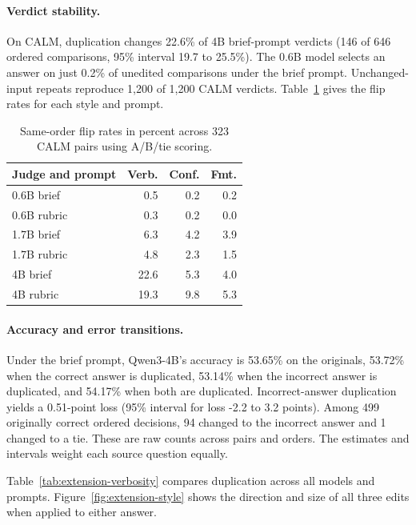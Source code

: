 \paragraph{Verdict stability.}

On CALM, duplication changes 22.6\% of 4B brief-prompt verdicts (146 of 646 ordered comparisons, 95\% interval 19.7 to 25.5\%). The 0.6B model selects an answer on just 0.2\% of unedited comparisons under the brief prompt. Unchanged-input repeats reproduce 1,200 of 1,200 CALM verdicts. Table~\ref{tab:extension-calm} gives the flip rates for each style and prompt.

\begin{table}[t]
\centering
\small
\setlength{\tabcolsep}{4.5pt}
\begin{tabular}{@{}lrrr@{}}
\toprule
Judge and prompt & Verb. & Conf. & Fmt. \\
\midrule
0.6B brief & 0.5 & 0.2 & 0.2 \\
0.6B rubric & 0.3 & 0.2 & 0.0 \\
1.7B brief & 6.3 & 4.2 & 3.9 \\
1.7B rubric & 4.8 & 2.3 & 1.5 \\
4B brief & 22.6 & 5.3 & 4.0 \\
4B rubric & 19.3 & 9.8 & 5.3 \\
\bottomrule
\end{tabular}
\caption{Same-order flip rates in percent across 323 CALM pairs using A/B/tie scoring.}
\label{tab:extension-calm}
\end{table}

\paragraph{Accuracy and error transitions.}

Under the brief prompt, Qwen3-4B's accuracy is 53.65\% on the originals, 53.72\% when the correct answer is duplicated, 53.14\% when the incorrect answer is duplicated, and 54.17\% when both are duplicated. Incorrect-answer duplication yields a 0.51-point loss (95\% interval for loss -2.2 to 3.2 points). Among 499 originally correct ordered decisions, 94 changed to the incorrect answer and 1 changed to a tie. These are raw counts across pairs and orders. The estimates and intervals weight each source question equally.

Table~\ref{tab:extension-verbosity} compares duplication across all models and prompts. Figure~\ref{fig:extension-style} shows the direction and size of all three edits when applied to either answer.

